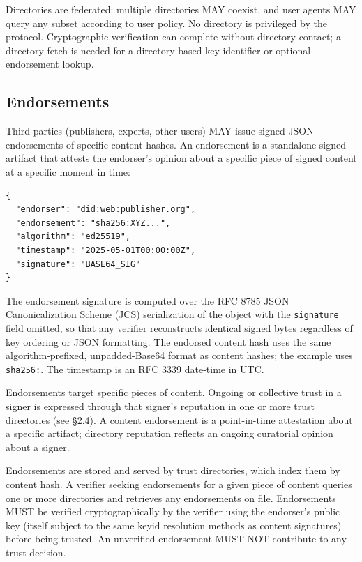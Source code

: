 \documentclass{article}
\begin{document}
Directories are federated: multiple directories MAY coexist, and user agents MAY query any subset according to user policy. No directory is privileged by the protocol. Cryptographic verification can complete without directory contact; a directory fetch is needed for a directory-based key identifier or optional endorsement lookup.

\subsection{Endorsements}
Third parties (publishers, experts, other users) MAY issue signed JSON endorsements of specific content hashes. An endorsement is a standalone signed artifact that attests the endorser's opinion about a specific piece of signed content at a specific moment in time:

\begin{lstlisting}[basicstyle=\ttfamily\footnotesize]
{
  "endorser": "did:web:publisher.org",
  "endorsement": "sha256:XYZ...",
  "algorithm": "ed25519",
  "timestamp": "2025-05-01T00:00:00Z",
  "signature": "BASE64_SIG"
}
\end{lstlisting}

The endorsement signature is computed over the RFC 8785 JSON Canonicalization Scheme (JCS) serialization of the object with the \texttt{signature} field omitted, so that any verifier reconstructs identical signed bytes regardless of key ordering or JSON formatting. The endorsed content hash uses the same algorithm-prefixed, unpadded-Base64 format as content hashes; the example uses \texttt{sha256:}. The timestamp is an RFC 3339 date-time in UTC.

Endorsements target specific pieces of content. Ongoing or collective trust in a signer is expressed through that signer's reputation in one or more trust directories (see \S2.4). A content endorsement is a point-in-time attestation about a specific artifact; directory reputation reflects an ongoing curatorial opinion about a signer.

Endorsements are stored and served by trust directories, which index them by content hash. A verifier seeking endorsements for a given piece of content queries one or more directories and retrieves any endorsements on file. Endorsements MUST be verified cryptographically by the verifier using the endorser's public key (itself subject to the same keyid resolution methods as content signatures) before being trusted. An unverified endorsement MUST NOT contribute to any trust decision.
\end{document}
